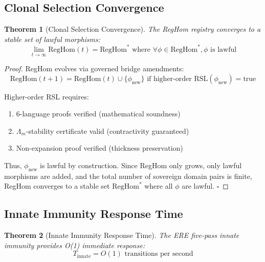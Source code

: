 \documentclass[11pt,a4paper]{article}
\newtheorem{theorem}{Theorem}[section]
\begin{document}
\subsection{Clonal Selection Convergence}

\begin{theorem}[Clonal Selection Convergence]\label{thm:clonal_convergence}
The RegHom registry converges to a stable set of lawful morphisms:
\begin{equation}
\lim_{t \to \infty} \text{RegHom}(t) = \text{RegHom}^* \text{ where } \forall \phi \in \text{RegHom}^*, \phi \text{ is lawful}
\end{equation}
\end{theorem}

\begin{proof}
RegHom evolves via governed bridge amendments:
\begin{equation}
\text{RegHom}(t+1) = \text{RegHom}(t) \cup \{\phi_{\text{new}}\} \text{ if higher-order RSL}(\phi_{\text{new}}) = \text{true}
\end{equation}

Higher-order RSL requires:
\begin{enumerate}
    \item 6-language proofs verified (mathematical soundness)
    \item $\Lambda_m$-stability certificate valid (contractivity guaranteed)
    \item Non-expansion proof verified (thickness preservation)
\end{enumerate}

Thus, $\phi_{\text{new}}$ is lawful by construction. Since RegHom only grows, only lawful morphisms are added, and the total number of sovereign domain pairs is finite, RegHom converges to a stable set $\text{RegHom}^*$ where all $\phi$ are lawful. \hfill$\square$
\end{proof}

\subsection{Innate Immunity Response Time}

\begin{theorem}[Innate Immunity Response Time]\label{thm:innate_response}
The ERE five-pass innate immunity provides O(1) immediate response:
\begin{equation}
T_{\text{innate}} = O(1) \text{ transitions per second}
\end{equation}
\end{theorem}
\end{document}
